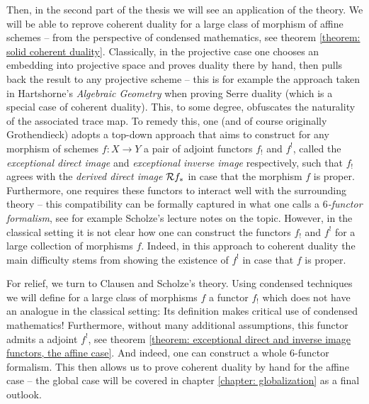 Then, in the second part of the thesis we will see an application of the theory. We will be able to reprove coherent duality for a large class of morphism of affine schemes -- from the perspective of condensed mathematics, see theorem \ref{theorem: solid coherent duality}. Classically, in the projective case one chooses an embedding into projective space and proves duality there by hand, then pulls back the result to any projective scheme -- this is for example the approach taken in Hartshorne's \emph{Algebraic Geometry} \cite[Chap. III. §7.1 and §7.6]{algebraic-geometry} when proving Serre duality (which is a special case of coherent duality). This, to some degree, obfuscates \eg the naturality of the associated trace map. To remedy this, one (and of course originally Grothendieck) adopts a top-down approach that aims to construct for any morphism of schemes $f\colon X\to Y$ a pair of adjoint functors $f_!$ and $f^!$, called the \emph{exceptional direct image} and \emph{exceptional inverse image} respectively, such that $f_!$ agrees with the \emph{derived direct image} $\mathcal{R} f_\ast$ in case that the morphism $f$ is proper. Furthermore, one requires these functors to interact well with the surrounding theory -- this compatibility can be formally captured in what one calls a \emph{$6$-functor formalism}, see for example Scholze's lecture notes \cite{sixfunctors} on the topic. However, in the classical setting it is not clear how one can construct the functors $f_!$ and $f^!$ for a large collection of morphisms $f$. Indeed, in this approach to coherent duality the main difficulty stems from showing the existence of $f^!$ in case that $f$ is proper. 

For relief, we turn to Clausen and Scholze's theory. Using condensed techniques we will define for a large class of morphisms $f$ a functor $f_!$ which does not have an analogue in the classical setting: Its definition makes critical use of condensed mathematics! Furthermore, without many additional assumptions, this functor admits a adjoint $f^!$, see theorem \ref{theorem: exceptional direct and inverse image functors, the affine case}. And indeed, one can construct a whole $6$-functor formalism. This then allows us to prove coherent duality by hand for the affine case -- the global case will be covered in chapter \ref{chapter: globalization} as a final outlook.

%
%
